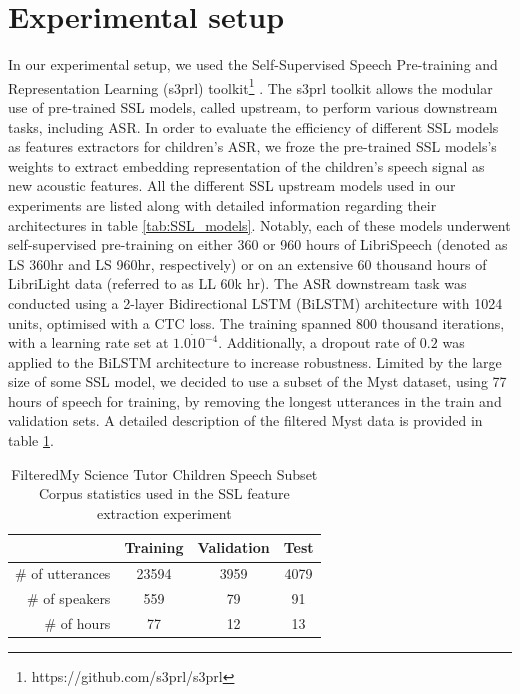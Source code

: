 \section{Experimental setup}
In our experimental setup, we used the Self-Supervised Speech Pre-training and Representation Learning (s3prl) toolkit\footnote{https://github.com/s3prl/s3prl} \cite{yang21c_interspeech}. The s3prl toolkit allows the modular use of pre-trained \ac{SSL} models, called upstream, to perform various downstream tasks, including \ac{ASR}. In order to evaluate the efficiency of different \ac{SSL} models as features extractors for children's \ac{ASR}, we froze the pre-trained \ac{SSL} models's weights to extract embedding representation of the children's speech signal as new acoustic features. All the different \ac{SSL} upstream models used in our experiments are listed along with detailed information regarding their architectures in table \ref{tab:SSL_models}. Notably, each of these models underwent self-supervised pre-training on either 360 or 960 hours of LibriSpeech \cite{librispeech} (denoted as LS 360hr and LS 960hr, respectively) or on an extensive 60 thousand hours of LibriLight data \cite{librilight} (referred to as LL 60k hr). 
The \ac{ASR} downstream task was conducted using a 2-layer Bidirectional \ac{LSTM} (BiLSTM) architecture with 1024 units, optimised with a \ac{CTC} loss. The training spanned 800 thousand iterations, with a learning rate set at $1.0\dot 10^{-4}$. Additionally, a dropout rate of $0.2$ was applied to the BiLSTM architecture to increase robustness. Limited by the large size of some \ac{SSL} model, we decided to use a subset of the Myst \cite{MyST} dataset, using 77 hours of speech for training, by removing the longest utterances in the train and validation sets. A detailed description of the filtered Myst data is provided in table \ref{tab:SSL_myst}.
\begin{table}[h!]

    
    \begin{center}
    \begin{tabular}{r|ccc}
    \hline
     & Training & Validation     & Test   \\ \hline
    \# of utterances & 23594   & 3959    & 4079  \\ 
    \# of speakers & 559  & 79    & 91  \\ 
    \# of hours & 77   & 12    & 13  \\ \hline
    \end{tabular}
    \caption{FilteredMy Science Tutor Children Speech Subset Corpus statistics used in the \ac{SSL} feature extraction experiment}
    \label{tab:SSL_myst}
    \end{center}
    \end{table}


